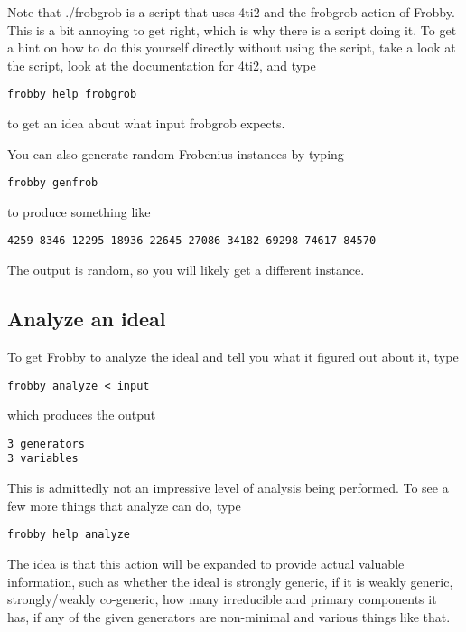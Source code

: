 \documentclass{amsart}
\theoremstyle{definition}
\begin{document}
Note that ./frobgrob is a script that uses 4ti2 and the frobgrob
action of Frobby. This is a bit annoying to get right, which is why
there is a script doing it. To get a hint on how to do this yourself
directly without using the script, take a look at the script, look at
the documentation for 4ti2, and type
\begin{verbatim}
frobby help frobgrob
\end{verbatim}
to get an idea about what input frobgrob expects.

You can also generate random Frobenius instances by typing
\begin{verbatim}
frobby genfrob
\end{verbatim}
to produce something like
\begin{verbatim}
4259 8346 12295 18936 22645 27086 34182 69298 74617 84570
\end{verbatim}
The output is random, so you will likely get a different instance.

\subsection{Analyze an ideal}

To get Frobby to analyze the ideal and tell you what it figured out
about it, type
\begin{verbatim}
frobby analyze < input
\end{verbatim}
which produces the output
\begin{verbatim}
3 generators
3 variables
\end{verbatim}
This is admittedly not an impressive level of analysis being
performed. To see a few more things that analyze can do, type
\begin{verbatim}
frobby help analyze
\end{verbatim}
The idea is that this action will be expanded to provide actual
valuable information, such as whether the ideal is strongly generic,
if it is weakly generic, strongly/weakly co-generic, how many
irreducible and primary components it has, if any of the given
generators are non-minimal and various things like that.
\begin{verbatim}
\end{verbatim}
\end{document}
